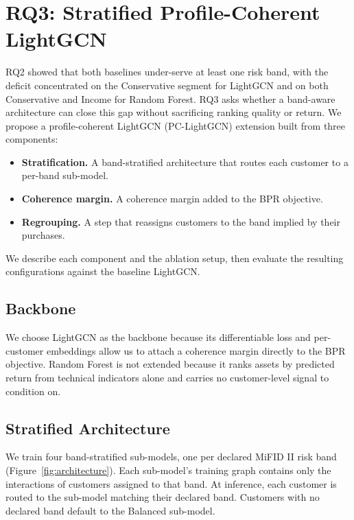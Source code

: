 \section{RQ3: Stratified Profile-Coherent LightGCN}
\label{sec:rq3}

RQ2 showed that both baselines under-serve at least one risk band, with the deficit concentrated on the Conservative segment for LightGCN and on both Conservative and Income for Random Forest. RQ3 asks whether a band-aware architecture can close this gap without sacrificing ranking quality or return. We propose a profile-coherent LightGCN (PC-LightGCN) extension built from three components:
\begin{itemize}
    \item \textbf{Stratification.} A band-stratified architecture that routes each customer to a per-band sub-model.
    \item \textbf{Coherence margin.} A coherence margin added to the BPR objective.
    \item \textbf{Regrouping.} A step that reassigns customers to the band implied by their purchases.
\end{itemize}
We describe each component and the ablation setup, then evaluate the resulting configurations against the baseline LightGCN.

\subsection{Backbone}
\label{sec:method:pclgcn}
We choose LightGCN as the backbone because its differentiable loss and per-customer embeddings allow us to attach a coherence margin directly to the BPR objective. Random Forest is not extended because it ranks assets by predicted return from technical indicators alone and carries no customer-level signal to condition on.

\subsection{Stratified Architecture}
We train four band-stratified sub-models, one per declared MiFID II risk band (Figure~\ref{fig:architecture}). Each sub-model's training graph contains only the interactions of customers assigned to that band. At inference, each customer is routed to the sub-model matching their declared band. Customers with no declared band default to the Balanced sub-model.


